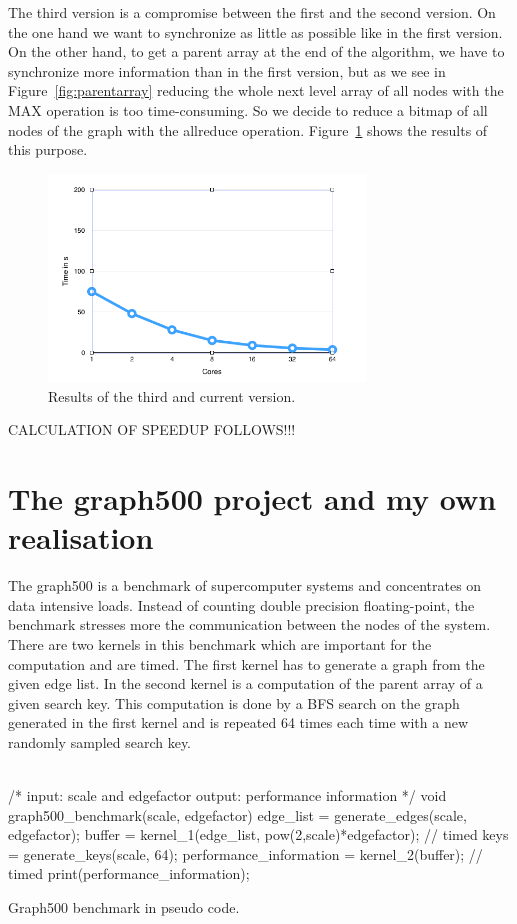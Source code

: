 \documentclass[12pt,a4paper]{article}
\begin{document}
The third version is a compromise between the first and the second version. On the one hand we want to synchronize as little as possible like in the first version. On the other hand, to get a parent array at the end of the algorithm, we have to synchronize more information than in the first version, but as we see in Figure~\ref{fig:parentarray} reducing the whole next level array of all nodes with the MAX operation is too time-consuming. So we decide to reduce a bitmap of all nodes of the graph with the allreduce operation. Figure~\ref{fig:allvisited} shows the results of this purpose.

\begin{figure}[H]
   \centering
   \includegraphics[width=0.75\textwidth]{allvisited}
   \caption{Results of the third and current version.}
   \label{fig:allvisited}
\end{figure}

CALCULATION OF SPEEDUP FOLLOWS!!!

\section{The graph500 project and my own realisation}
\label{sec:graph500}

The graph500 \cite{graph500} is a benchmark of supercomputer systems and concentrates on data intensive loads. Instead of counting double precision floating-point, the benchmark stresses more the communication between the nodes of the system. There are two kernels in this benchmark which are important for the computation and are timed. The first kernel has to generate a graph from the given edge list. In the second kernel is a computation of the parent array of a given search key. This computation is done by a BFS search on the graph generated in the first kernel and is repeated 64 times each time with a new randomly sampled search key.\\
\\
\begin{listing}[H]
\begin{ccode}
/*
input: scale and edgefactor
output: performance information
*/
void graph500_benchmark(scale, edgefactor){
	edge_list = generate_edges(scale, edgefactor);
	buffer = kernel_1(edge_list, pow(2,scale)*edgefactor); // timed
	keys = generate_keys(scale, 64);
	performance_information = kernel_2(buffer); // timed
	print(performance_information);
}
\end{ccode}
\caption{Graph500 benchmark in pseudo code.}
\label{lst:graph500}
\end{listing}
\end{document}
